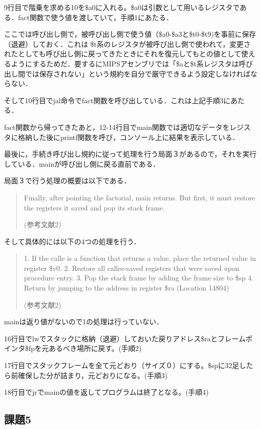 \documentclass[a4j]{jarticle}
\begin{document}
9行目で階乗を求める10を\$a0に入れる。\$a0は引数として用いるレジスタである．fact関数で使う値を渡していて，手順1にあたる．

ここでは呼び出し側で，被呼び出し側で使う値（\$a0-\$a3と\$t0-\$t9)を事前に保存（退避）しておく．これは \$t系のレジスタが被呼び出し側で使われて，変更されたとしても呼び出し側に戻ってきたときにそれを復元してもとの値として使えるようにするためだ．要するにMIPSアセンブリでは「\$aと\$t系レジスタは呼び出し間では保存されない」という規約を自分で厳守できるよう設定しなければならない．

そして10行目でjal命令でfact関数を呼び出している．これは上記手順3にあたる．

fact関数から帰ってきたあと，12-14行目でmain関数では適切なデータをレジスタに格納した後にprintf関数を呼び，コンソール上に結果を表示している．

最後に，手続き呼び出し規約に従って処理を行う局面３があるので，それを実行している．mainが呼び出し側に戻る直前である．

局面３で行う処理の概要は以下である．


\begin{quote}
Finally, after pointing the factorial, main returns. But first, it must restore the registers it saved and pop its stack frame.

(参考文献2)
\end{quote}

そして具体的には以下の4つの処理を行う．

\begin{quote}
1. If the calle is a function that returns a value, place the returned value in register \$v0.
2. Restore all callee-saved registers that were saved upon procedure entry.
3. Pop the stack frame by adding the frame size to \$sp
4. Return by jumping to the address in register \$ra
(Location 14804)

(参考文献2)
\end{quote}


mainは返り値がないので1の処理は行っていない．

16行目でlwでスタックに格納（退避）しておいた戻りアドレス\$raとフレームポインタ\$fpを元あるべき場所に戻す。(手順2)

17行目でスタックフレームを全て元どおり（サイズ０）にする。\$spに32足したら前確保した分が詰まり，元どおりになる。(手順3)

18行目でjrでmainの値を返してプログラムは終了となる。(手順4)



\subsection{課題5}
\end{document}
